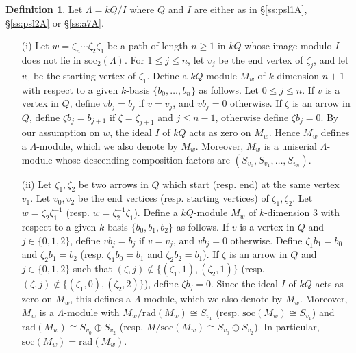 \documentclass{amsart}
\theoremstyle{plain}
\theoremstyle{definition}
\newtheorem{dfn}[thm]{Definition}
\theoremstyle{remark}
\begin{document}
\begin{dfn}
\label{def:dirstrings}
Let $\Lambda=kQ/I$ where $Q$ and $I$ are either as in \S\ref{ss:psl1A},   \S\ref{ss:psl2A} or \S\ref{ss:a7A}. 
\begin{enumerate}
\item[(i)] Let $w=\zeta_n\cdots\zeta_2\zeta_1$ be a path of length $n\ge 1$ in $kQ$ 
whose image modulo $I$ does not lie in $\mathrm{soc}_2(\Lambda)$. 
For $1\le j\le n$, let $v_j$ be the end vertex of $\zeta_j$, and let $v_0$  be the starting
vertex of $\zeta_1$. Define a $kQ$-module $M_w$ of $k$-dimension $n+1$ with respect 
to a given $k$-basis $\{b_0,\ldots,b_n\}$ as follows. Let $0\le j\le n$.
If $v$ is a vertex in $Q$, define $v b_j=b_j$ if $v=v_j$, and $v b_j=0$ otherwise. If
$\zeta$ is an arrow in $Q$, define $\zeta b_j=b_{j+1}$ if $\zeta=\zeta_{j+1}$ and $j\le n-1$, 
otherwise define $\zeta b_j=0$. By our assumption on $w$, the ideal $I$ of $kQ$ acts as zero on $M_w$.
Hence $M_w$ defines a $\Lambda$-module, which we also denote by $M_w$.
Moreover, $M_w$ is a uniserial $\Lambda$-module whose descending
composition factors are $(S_{v_0},S_{v_1},\ldots,S_{v_n})$.
\item[(ii)] Let $\zeta_1,\zeta_2$ be two arrows in $Q$ which start (resp. end) at the same vertex $v_1$.
Let $v_0, v_2$ be the end vertices (resp. starting vertices) of $\zeta_1,\zeta_2$. 
Let $w=\zeta_2\zeta_1^{-1}$ (resp. $w=\zeta_2^{-1}\zeta_1$).
Define a $kQ$-module $M_w$ of $k$-dimension $3$ with respect to a given $k$-basis $\{b_0,b_1,b_2\}$
as follows. If $v$ is a vertex in $Q$ and $j\in\{0,1,2\}$, define $v b_j=b_j$ if $v=v_j$, and $v b_j=0$ otherwise. 
Define $\zeta_1 b_1 = b_0$ and $\zeta_2 b_1=b_2$ (resp. $\zeta_1 b_0=b_1$ and $\zeta_2 b_2=b_1$).
If $\zeta$ is an arrow in $Q$ and $j\in\{0,1,2\}$ such that
$(\zeta,j)\not\in\{(\zeta_1,1),(\zeta_2,1)\}$ (resp. $(\zeta,j)\not\in\{(\zeta_1,0),(\zeta_2,2)\}$),
define $\zeta b_j=0$. Since the ideal $I$ of $kQ$ acts as zero on $M_w$, this defines a 
$\Lambda$-module, which we also denote by $M_w$. Moreover, $M_w$ is a $\Lambda$-module with
$M_w/\mathrm{rad}(M_w)\cong S_{v_1}$ (resp. $\mathrm{soc}(M_w)\cong S_{v_1}$) and
$\mathrm{rad}(M_w)\cong S_{v_0}\oplus S_{v_2}$ (resp. $M/\mathrm{soc}(M_w)\cong S_{v_0}\oplus S_{v_2}$).
In particular, $\mathrm{soc}(M_w) = \mathrm{rad}(M_w)$.
\end{enumerate}
\end{dfn}
\end{document}
